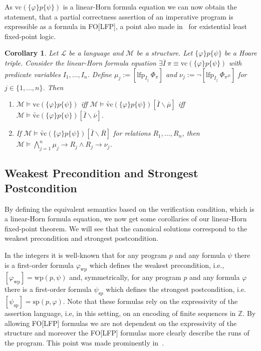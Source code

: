 \documentclass[acmsmall]{acmart}
\theoremstyle{plain}
\newtheorem{corollary}[theorem]{Corollary}
\theoremstyle{definition}
\newcommand{\calL}{\mathcal{L}}
\newcommand{\calM}{\mathcal{M}}
\newcommand{\mybar}[1]{\overline{#1}}
\newcommand{\Int}{\mathbb{Z}}
\newcommand{\lfp}{\mathrm{lfp}} %
\newcommand{\hoare}[3]{\{#1\}#2\{#3\}}
\newcommand{\vc}{\mathrm{vc}}
\newcommand{\vct}{\tilde{\vc}}
\newcommand{\wpc}{\mathrm{wp}}
\newcommand{\spc}{\mathrm{sp}}
\begin{document}
As $\vc(\hoare{\varphi}{p}{\psi})$ is a linear-Horn formula equation we can now obtain the statement, that a partial correctness assertion of an imperative program
is expressible as a formula in FO[LFP], a point also made in~\cite{Blass87Existential} for existential least fixed-point logic.
\begin{corollary}\label{HoareVCLinearCorollary}
	Let $\calL$ be a language and $\calM$ be a structure. Let $\hoare{\varphi}{p}{\psi}$ be a Hoare triple. Consider the linear-Horn formula equation $\exists \mybar{I} ~\pi \equiv \vc(\hoare{\varphi}{p}{\psi})$ with predicate variables $I_1,...,I_n$. Define $\mu_j := [\lfp_{I_j} ~\Phi_{\pi}]$ and $\nu_j := \neg [\lfp_{I_j} ~\Phi_{\pi^D}]$ for $j \in \{1,...,n\}$. Then 
	\begin{enumerate}
		\item $\calM \models \vc(\hoare{\varphi}{p}{\psi})$ iff $\calM \models \vct(\hoare{\varphi}{p}{\psi})[\mybar{I}\backslash \mybar{\mu}]$ iff $\calM \models \vct(\hoare{\varphi}{p}{\psi})[\mybar{I}\backslash \mybar{\nu}]$.
		\item If $\calM \models \vct(\hoare{\varphi}{p}{\psi})[\mybar{I}\backslash \mybar{R}]$ for relations $R_1,...,R_n$, then $\calM \models \bigwedge_{j=1}^n \mu_j \rightarrow R_j \wedge R_j \rightarrow \nu_j$. 
	\end{enumerate}
\end{corollary}



\subsection{Weakest Precondition and Strongest Postcondition}

By defining the equivalent semantics based on the verification condition, which is a linear-Horn formula equation, we now get some corollaries of our linear-Horn fixed-point theorem. We will see that the canonical solutions correspond to the weakest precondition and strongest postcondition. 

In the integers it is well-known that for any program $p$ and any formula $\psi$ there is a first-order formula
$\varphi_\wpc$ which defines the weakest precondition, i.e., $[\varphi_\wpc] = \wpc(p,\psi)$ and, symmetrically,
for any program $p$ and any formula $\varphi$ there is a first-order formula $\psi_\spc$ which
defines the strongest postcondition, i.e. $[\psi_\spc] = \spc(p,\varphi)$.
Note that these formulas rely on the expressivity of the assertion language, i.e, in this setting, 
on an encoding of finite sequences in $\Int$. By allowing FO[LFP] formulas we are not dependent on
 the expressivity of the structure and moreover the FO[LFP] formulas more clearly describe the runs of the program. 
This point was made prominently in~\cite{Blass87Existential}.
\end{document}
